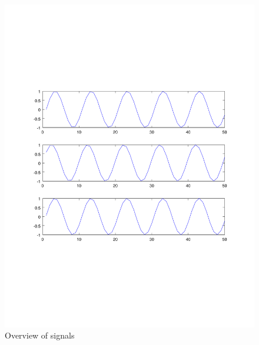 \begin{figure}
\centering
\includegraphics[scale=0.4]{Figures/hifreq}
\caption{Overview of signals}
\label{fig:windowshi100}
\end{figure}

